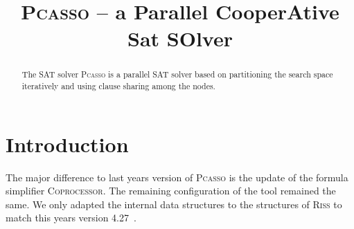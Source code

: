 \documentclass[conference]{IEEEtran}
\newcommand{\1}{x_1}
\newcommand{\2}{x_2}
\newcommand{\3}{x_3}
\newcommand{\4}{x_4}
\newcommand{\5}{x_5}
\newcommand{\6}{x_6}
\newcommand{\7}{x_7}
\newcommand{\8}{x_8}
\newcommand{\9}{x_9}
\newcommand{\pcasso}{\textsc{Pcasso}\xspace}
\newcommand{\coprocessor}{\textsc{Coprocessor}\xspace}
\newcommand{\riss}{\textsc{Riss}\xspace}
\begin{document}
	
\title{\textsc{Pcasso} -- a Parallel CooperAtive Sat SOlver}

\author{
 \and
 \and
{}
}



\maketitle

\begin{abstract}
The SAT solver \pcasso is a parallel SAT solver based on partitioning the search space iteratively and using clause sharing among the nodes.
\end{abstract}

\section{Introduction}

The major difference to last years version of \pcasso is the update of the formula simplifier \coprocessor. 
The remaining configuration of the tool remained the same. 
We only adapted the internal data structures to the structures of \riss to match this years version 4.27~\cite{riss427}. 
\end{document}

